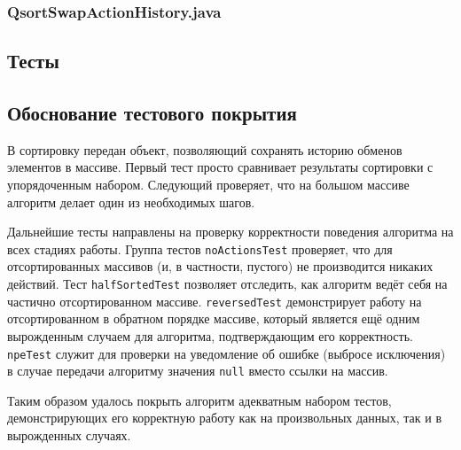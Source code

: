 \subsubsection{QsortSwapActionHistory.java}

\subsection{Тесты}

\subsection{Обоснование тестового покрытия}
В сортировку передан объект, позволяющий сохранять историю обменов элементов в массиве.
Первый тест просто сравнивает результаты сортировки с упорядоченным набором.
Следующий проверяет, что на большом массиве алгоритм делает один из необходимых шагов.

Дальнейшие тесты направлены на проверку корректности поведения алгоритма на всех стадиях работы.
Группа тестов \texttt{noActionsTest} проверяет, что для отсортированных массивов
(и, в частности, пустого) не производится никаких действий. Тест \texttt{halfSortedTest}
позволяет отследить, как алгоритм ведёт себя на частично отсортированном массиве.
\texttt{reversedTest} демонстрирует работу на отсортированном в обратном порядке
массиве, который является ещё одним вырожденным случаем для алгоритма, подтверждающим
его корректность. \texttt{npeTest} служит для проверки на уведомление об ошибке
(выбросе исключения) в случае передачи алгоритму значения \texttt{null} вместо
ссылки на массив.

Таким образом удалось покрыть алгоритм адекватным набором тестов, демонстрирующих
его корректную работу как на произвольных данных, так и в вырожденных случаях.
